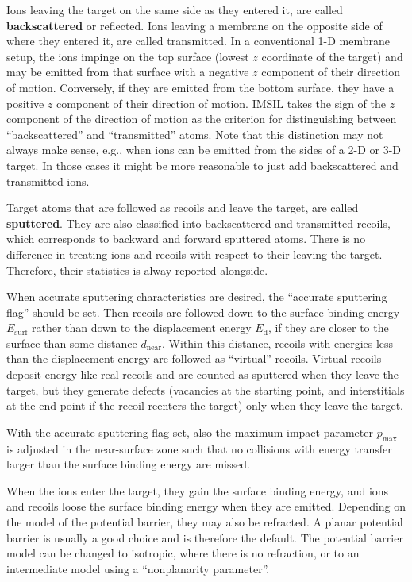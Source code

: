 Ions leaving the target on the same side as they entered it, are called
\textbf{backscattered} or reflected. Ions leaving a membrane on the opposite
side of where they entered it, are called transmitted. In a conventional 1-D
membrane setup, the ions impinge on the top surface (lowest $z$ coordinate of the
target) and may be emitted from that surface with a negative $z$ component of
their direction of motion. Conversely, if they are emitted from the bottom
surface, they have a positive $z$ component of their direction of motion. IMSIL
takes the sign of the $z$ component of the direction of motion as the criterion
for distinguishing between ``backscattered'' and ``transmitted'' atoms. Note
that this distinction may not always make sense, e.g., when ions can be emitted
from the sides of a 2-D or 3-D target. In those cases it might be more
reasonable to just add backscattered and transmitted ions.

Target atoms that are followed as recoils and leave the target, are called
\textbf{sputtered}. They are also classified into backscattered and transmitted
recoils, which corresponds to backward and forward sputtered atoms. There is no
difference in treating ions and recoils with respect to their leaving the
target. Therefore, their statistics is alway reported alongside.

When accurate sputtering characteristics are desired, the ``accurate sputtering
flag'' should be set. Then recoils are followed down to the surface binding
energy $E_\mathrm{surf}$ rather than down to the displacement energy
$E_\mathrm{d}$, if they are closer to the surface than some distance
$d_\mathrm{near}$. Within this distance, recoils with energies less than the
displacement energy are followed as ``virtual'' recoils. Virtual recoils deposit
energy like real recoils and are counted as sputtered when they leave the
target, but they generate defects (vacancies at the starting point, and
interstitials at the end point if the recoil reenters the target) only when they
leave the target.
  
With the accurate sputtering flag set, also the maximum impact parameter
$p_\mathrm{max}$ is adjusted in the near-surface zone such that no collisions
with energy transfer larger than the surface binding energy are missed.

When the ions enter the target, they gain the surface binding energy, and ions
and recoils loose the surface binding energy when they are emitted. Depending on
the model of the potential barrier, they may also be refracted. A planar
potential barrier \cite{I6909} is usually a good choice and is therefore the
default. The potential barrier model can be changed to isotropic, where there is
no refraction, or to an intermediate model \cite{hobler_assessment_2013} using a
``nonplanarity parameter''.

